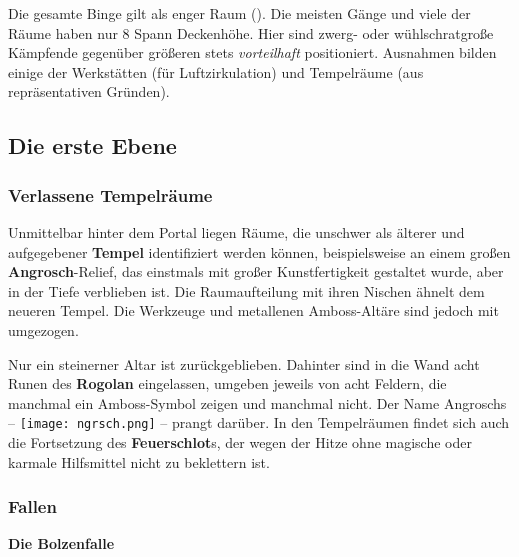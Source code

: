 Die gesamte Binge gilt als enger Raum ().
Die meisten Gänge und viele der Räume haben nur 8 Spann Deckenhöhe.
Hier sind zwerg- oder wühlschratgroße Kämpfende gegenüber größeren stets \emph{vorteilhaft} positioniert.
Ausnahmen bilden einige der Werkstätten (für Luftzirkulation) und  Tempelräume (aus repräsentativen Gründen).

\subsection{Die erste Ebene}

\subsubsection{Verlassene Tempelräume}
Unmittelbar hinter dem Portal liegen Räume, die unschwer als älterer und aufgegebener \textbf{Tempel} identifiziert werden können,
beispielsweise an einem großen \textbf{Angrosch}-Relief, das einstmals mit großer Kunstfertigkeit gestaltet wurde, aber in der Tiefe verblieben ist.
Die Raumaufteilung mit ihren Nischen ähnelt dem neueren Tempel.
Die Werkzeuge und metallenen Amboss-Altäre sind jedoch mit umgezogen.

Nur ein steinerner Altar ist zurückgeblieben. Dahinter sind in die Wand acht Runen des \textbf{Rogolan} eingelassen, umgeben jeweils von acht Feldern, die manchmal ein Amboss-Symbol zeigen und manchmal nicht.
Der Name Angroschs -- \texttt{[image: ngrsch.png]} --
prangt darüber.
In den Tempelräumen findet sich auch die Fortsetzung des \textbf{Feuerschlot}s, der wegen der Hitze ohne magische oder karmale Hilfsmittel nicht zu beklettern ist.

\subsubsection{Fallen}

\textbf{Die Bolzenfalle}

